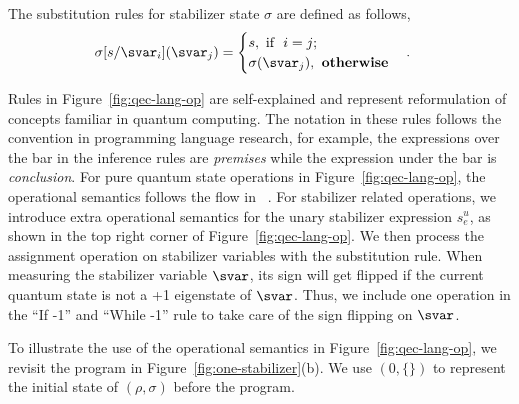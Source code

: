 \begin{definition} The substitution rules for stabilizer state $\sigma$ are defined as follows,
\begin{align*}
\sigma[s/\svar_i](\svar_j) &= \begin{cases}
s, \text{ if }\ i = j;\\
\sigma(\svar_j), \textbf{ otherwise} 
\end{cases}.
\end{align*}
\end{definition}



Rules in Figure~\ref{fig:qec-lang-op} are self-explained and represent reformulation of concepts familiar in quantum computing. The notation in these rules follows the convention in programming language research, for example, the expressions over the bar in the inference rules are \textit{premises} while the expression under the bar is \textit{conclusion}.
For pure quantum state operations in Figure~\ref{fig:qec-lang-op}, the operational semantics follows the flow in {\qwhilelang}~\cite{Ying2012FloydhoareLF}.  
For stabilizer related operations, we introduce extra operational semantics for the unary stabilizer expression $s_e^u$, as shown in the top right corner of Figure~\ref{fig:qec-lang-op}. We then process the assignment operation on stabilizer variables with the substitution rule.
When measuring the stabilizer variable $\svar$, its sign will get flipped if the current quantum state is not a +1 eigenstate of  $\svar$. Thus, we include one operation in the ``If -1'' and ``While -1'' rule to take care of the sign flipping on $\svar$.

To illustrate the use of the operational semantics in Figure~\ref{fig:qec-lang-op}, we revisit the program in Figure~\ref{fig:one-stabilizer}(b). We use $(0,\{\})$ to represent the initial state of $(\rho, \sigma)$ before the program.

